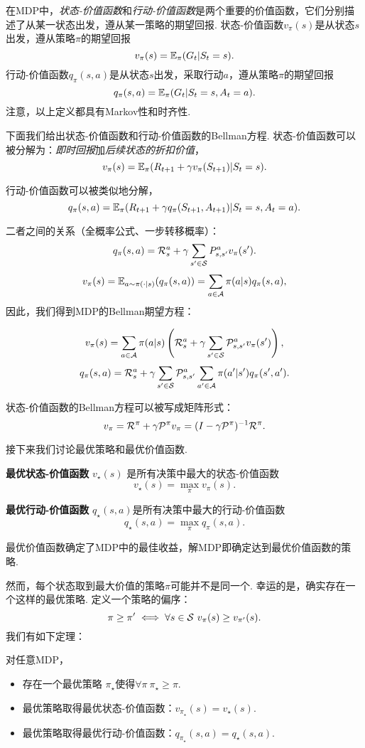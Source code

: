 在MDP中，\emph{状态-价值函数}和\emph{行动-价值函数}是两个重要的价值函数，它们分别描述了从某一状态出发，遵从某一策略的期望回报. 
状态-价值函数$v_\pi(s)$是从状态$s$出发，遵从策略$\pi$的期望回报
    \[v_\pi(s) = \E_\pi(G_t|S_t=s).\]
行动-价值函数$q_\pi(s,a)$是从状态$s$出发，采取行动$a$，遵从策略$\pi$的期望回报
    \[q_\pi(s,a) = \E_\pi(G_t|S_t=s,A_t=a).\]
注意，以上定义都具有Markov性和时齐性.

下面我们给出状态-价值函数和行动-价值函数的Bellman方程. 
状态-价值函数可以被分解为：\emph{即时回报}加\emph{后续状态的折扣价值}，
\[v_\pi(s) = \E_\pi(R_{t+1} + \gamma v_\pi(S_{t+1})|S_t=s).\]

行动-价值函数可以被类似地分解，
\[q_\pi(s,a) = \E_\pi(R_{t+1} + \gamma q_\pi(S_{t+1},A_{t+1})|S_t=s,A_t=a).\]

二者之间的关系（全概率公式、一步转移概率）：
\[q_\pi(s,a) =\mathcal R_s^a + \gamma \sum_{s'\in \MS}P_{s,s'}^a v_\pi(s').\]
\[v_\pi(s) = \E_{a\sim\pi(\cdot|s)}(q_\pi(s,a))=\sum_{a\in\mathcal A}\pi(a|s)q_\pi(s,a),\]
因此，我们得到MDP的Bellman期望方程：

\begin{proposition}
\[v_\pi(s) = \sum_{a\in \mathcal A}\pi(a|s)\left(\mathcal R_s^a + \gamma \sum_{s'\in \MS}\P_{s,s'}^av_\pi(s')\right),\]
\[q_\pi(s,a) = \mathcal R_s^a + \gamma \sum_{s'\in \MS}\P_{s,s'}^a \sum_{a'\in \mathcal A}\pi(a'|s')q_\pi(s',a').\]
\end{proposition}

状态-价值函数的Bellman方程可以被写成矩阵形式：
\[v_\pi = \mathcal R^\pi + \gamma \P^\pi v_\pi = (I-\gamma \mathcal P^\pi)^{-1}\mathcal R^\pi.\]

接下来我们讨论最优策略和最优价值函数. 

\begin{definition}
\textbf{最优状态-价值函数} $v_\star(s)$ 是所有决策中最大的状态-价值函数
    \[v_\star(s) = \max_\pi v_\pi(s).\]

\textbf{最优行动-价值函数} $q_\star(s,a)$是所有决策中最大的行动-价值函数
    \[q_\star(s,a) = \max_\pi q_\pi(s,a).\]
\end{definition}
最优价值函数确定了MDP中的最佳收益，解MDP即确定达到最优价值函数的策略. 

然而，每个状态取到最大价值的策略$\pi$可能并不是同一个. 幸运的是，确实存在一个这样的最优策略. 定义一个策略的偏序：
    \[\pi\ge\pi' \iff \forall s\in\MS\ v_\pi(s) \ge v_{\pi'}(s).\]
我们有如下定理：
\begin{theorem}[MDP解的存在性]
对任意MDP，
\begin{itemize}
    \item 存在一个最优策略 $\pi_\star$使得$\forall \pi\ \pi_\star\ge\pi$.
    \item 最优策略取得最优状态-价值函数：$v_{\pi_\star}(s) = v_\star(s)$.
    \item 最优策略取得最优行动-价值函数：$q_{\pi_\star}(s,a)=q_\star(s,a)$.
\end{itemize}
\end{theorem}

